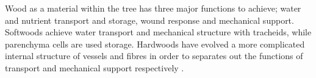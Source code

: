 Wood as a material within the tree has three major functions to achieve; water
and nutrient transport and storage, wound response and mechanical support. Softwoods
achieve water transport and mechanical structure with tracheids, while
parenchyma cells are used storage. Hardwoods have evolved a more
complicated internal structure of vessels and fibres in order to separates out
the functions of transport and mechanical support respectively \cite{walker1993primary}.
